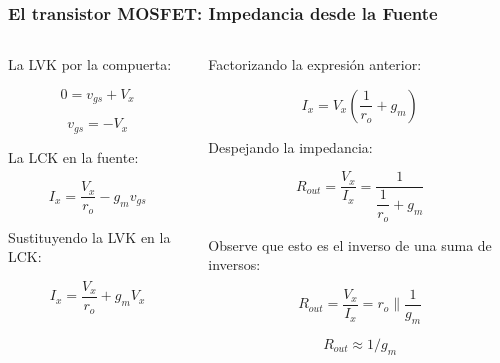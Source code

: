 \begin{frame}[t]
    \frametitle{El transistor MOSFET: Impedancia desde la Fuente}

    \begin{columns}
        \begin{column}{0.5\textwidth}
            La LVK por la compuerta:

            \[ 0 = v_{gs} + V_x \]

            \[ v_{gs} = -V_x \]

            \vspace{3mm}
            La LCK en la fuente:

            \[ I_x = \dfrac{V_x}{r_o} - g_m v_{gs} \]

            \vspace{3mm}
            Sustituyendo la LVK en la LCK:

            \[ I_x = \dfrac{V_x}{r_o} + g_m V_x \]
        \end{column}
        \begin{column}{0.5\textwidth}
            Factorizando la expresión anterior:

            \[ I_x = V_x \left( \dfrac{1}{r_o} + g_m \right) \]

            \vspace{3mm}
            Despejando la impedancia:

            \[ R_{out} = \dfrac{V_x}{I_x} = \dfrac{1}{\dfrac{1}{r_o} + g_m } \]

            \vspace{3mm}
            Observe que esto es el inverso de una suma de inversos:

            \[ \boxed{R_{out} = \dfrac{V_x}{I_x} = r_o \parallel \dfrac{1}{g_m}} \]

            \[ \boxed{R_{out} \approx 1/g_m} \]
        \end{column}
    \end{columns}

\end{frame}


